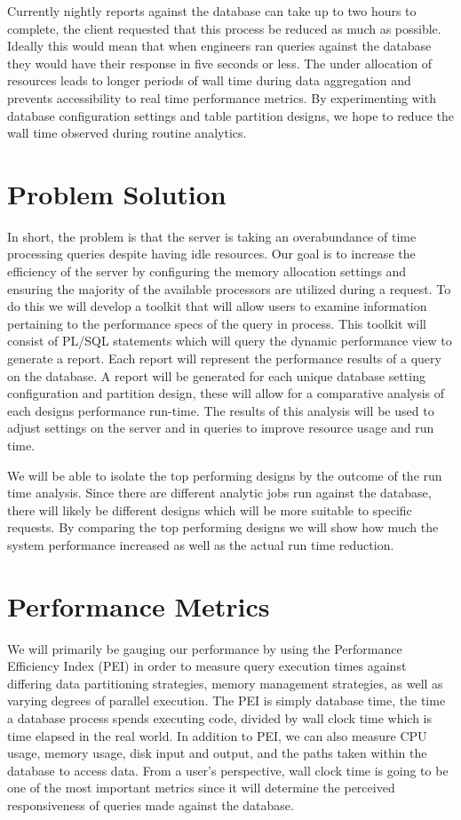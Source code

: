 \documentclass[draftclsnofoot, onecolumn, 10pt]{IEEEtran}
\begin{document}
Currently nightly reports against the database can take up to two hours to complete, the client requested that this process be reduced as much as possible.
Ideally this would mean that when engineers ran queries against the database they would have their response in five seconds or less.
The under allocation of resources leads to longer periods of wall time during data aggregation and prevents accessibility to real time performance metrics.
By experimenting with database configuration settings and table partition designs, we hope to reduce the wall time observed during routine analytics.

\vspace{0.5 in}

\section*{Problem Solution}
In short, the problem is that the server is taking an overabundance of time processing queries despite having idle resources.
Our goal is to increase the efficiency of the server by configuring the memory allocation settings and ensuring the majority of the available processors are utilized during a request.
To do this we will develop a toolkit that will allow users to examine information pertaining to the performance specs of the query in process.
This toolkit will consist of PL/SQL statements which will query the dynamic performance view to generate a report.
Each report will represent the performance results of a query on the database.
A report will be generated for each unique database setting configuration and partition design, these will allow for a comparative analysis of each designs performance run-time.
The results of this analysis will be used to adjust settings on the server and in queries to improve resource usage and run time. 


We will be able to isolate the top performing designs by the outcome of the run time analysis.
Since there are different analytic jobs run against the database, there will likely be different designs which will be more suitable to specific requests.
By comparing the top performing designs we will show how much the system performance increased as well as the actual run time reduction.  

\section*{Performance Metrics}
We will primarily be gauging our performance by using the Performance Efficiency Index (PEI) in order to measure query execution times against differing data partitioning strategies, memory management strategies, as well as varying degrees of parallel execution.
The PEI is simply database time, the time a database process spends executing code, divided by wall clock time which is time elapsed in the real world.
In addition to PEI, we can also measure CPU usage, memory usage, disk input and output, and the paths taken within the database to access data.
From a user’s perspective, wall clock time is going to be one of the most important metrics since it will determine the perceived responsiveness of queries made against the database.
\end{document}
